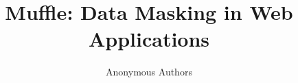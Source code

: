 \documentclass[letterpaper,twocolumn,10pt]{article}
\newcommand{\name}{Muffle\xspace}
\begin{document}

\date{}

\title{\Large \bf \name: Data Masking in Web Applications}


\author{
{\rm Anonymous Authors}\\
} %

\maketitle



%



%





\printbibliography

\end{document}
